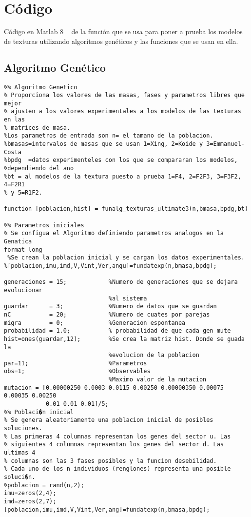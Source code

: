 \chapter{C\'odigo}
C\'odigo en Matlab 8 ~\cite{matlab} de la funci\'on que se usa para poner a
prueba los modelos de texturas utilizando algoritmos gen\'eticos y las funciones
que se usan en ella.
\section{Algoritmo Gen\'etico}
\begin{verbatim}
%% Algoritmo Genetico
% Proporciona los valores de las masas, fases y parametros libres que mejor
% ajusten a los valores experimentales a los modelos de las texturas en las
% matrices de masa.
%Los parametros de entrada son n= el tamano de la poblacion.
%bmasas=intervalos de masas que se usan 1=Xing, 2=Koide y 3=Emmanuel-Costa
%bpdg  =datos experimenteles con los que se compararan los modelos,
%dependiendo del ano 
%bt = al modelos de la textura puesto a prueba 1=F4, 2=F2F3, 3=F3F2, 4=F2R1 
% y 5=R1F2.

function [poblacion,hist] = funalg_texturas_ultimate3(n,bmasa,bpdg,bt)

%% Parametros iniciales
% Se configua el Algoritmo definiendo parametros analogos en la Genatica
format long
 %Se crean la poblacion inicial y se cargan los datos experimentales.
%[poblacion,imu,imd,V,Vint,Ver,angu]=fundatexp(n,bmasa,bpdg);     
                             
generaciones = 15;            %Numero de generaciones que se dejara evolucionar
                              %al sistema
guardar      = 3;             %Numero de datos que se guardan
nC           = 20;            %Numero de cuates por parejas
migra        = 0;             %Generacion espontanea  
probabilidad = 1.0;           % probabilidad de que cada gen mute
hist=ones(guardar,12);        %Se crea la matriz hist. Donde se guada la 
                              %evolucion de la poblacion
par=11;                       %Parametros
obs=1;                        %Observables
                              %Maximo valor de la mutacion
mutacion = [0.00000250 0.0003 0.0115 0.00250 0.00000350 0.00075 0.00035 0.00250
            0.01 0.01 0.01]/5;
%% Poblaci�n inicial
% Se genera aleatoriamente una poblacion inicial de posibles soluciones.
% Las primeras 4 columnas representan los genes del sector u. Las
% siguientes 4 columnas representan los genes del sector d. Las ultimas 4
% columnas son las 3 fases posibles y la funcion desebilidad.
% Cada uno de los n individuos (renglones) representa una posible soluci�n.
%poblacion = rand(n,2);
imu=zeros(2,4);
imd=zeros(2,7);
[poblacion,imu,imd,V,Vint,Ver,ang]=fundatexp(n,bmasa,bpdg);


\end{verbatim}
